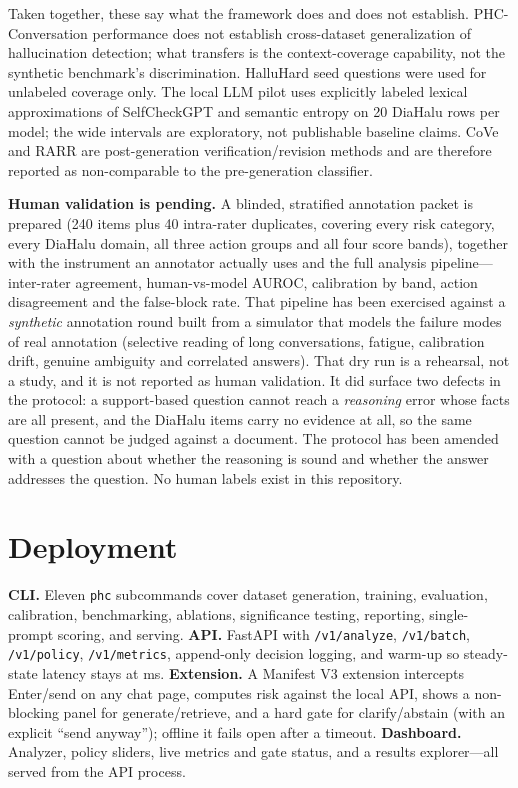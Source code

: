 \documentclass[10pt]{article}
\begin{document}
Taken together, these say what the framework does and does not establish.
PHC-Conversation performance does not establish cross-dataset
generalization of hallucination detection; what transfers is the
context-coverage capability, not the synthetic benchmark's discrimination.
HalluHard seed questions were used for unlabeled coverage only. The local
LLM pilot uses explicitly labeled lexical approximations of SelfCheckGPT and
semantic entropy on 20 DiaHalu rows per model; the wide intervals are
exploratory, not publishable baseline claims. CoVe and RARR are
post-generation verification/revision methods and are therefore reported as
non-comparable to the pre-generation classifier.

\textbf{Human validation is pending.} A blinded, stratified annotation
packet is prepared (240 items plus 40 intra-rater duplicates, covering every
risk category, every DiaHalu domain, all three action groups and all four
score bands), together with the instrument an annotator actually uses and
the full analysis pipeline---inter-rater agreement, human-vs-model AUROC,
calibration by band, action disagreement and the false-block rate. That
pipeline has been exercised against a \emph{synthetic} annotation round
built from a simulator that models the failure modes of real annotation
(selective reading of long conversations, fatigue, calibration drift,
genuine ambiguity and correlated answers). That dry run is a rehearsal, not
a study, and it is not reported as human validation. It did surface two
defects in the protocol: a support-based question cannot reach a
\emph{reasoning} error whose facts are all present, and the DiaHalu items
carry no evidence at all, so the same question cannot be judged against a
document. The protocol has been amended with a question about whether the
reasoning is sound and whether the answer addresses the question. No human
labels exist in this repository.
\section{Deployment}
\textbf{CLI.} Eleven \texttt{phc} subcommands cover dataset generation,
training, evaluation, calibration, benchmarking, ablations, significance
testing, reporting, single-prompt scoring, and serving.
\textbf{API.} FastAPI with \texttt{/v1/analyze}, \texttt{/v1/batch},
\texttt{/v1/policy}, \texttt{/v1/metrics}, append-only decision logging, and
warm-up so steady-state latency stays at \latmedian{} ms.
\textbf{Extension.} A Manifest V3 extension intercepts Enter/send on any
chat page, computes risk against the local API, shows a non-blocking panel
for generate/retrieve, and a hard gate for clarify/abstain (with an explicit
``send anyway''); offline it fails open after a timeout.
\textbf{Dashboard.} Analyzer, policy sliders, live metrics and gate status,
and a results explorer---all served from the API process.
\end{document}
